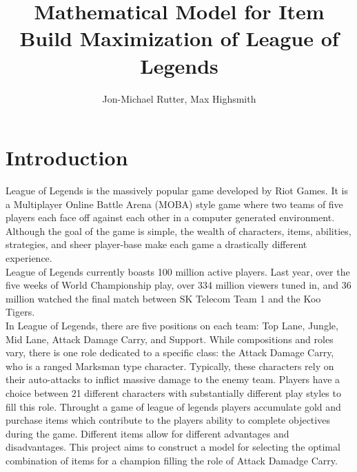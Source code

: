 \documentclass{article}
\begin{document}
\title{Mathematical Model for Item Build Maximization of League of Legends}
\author{Jon-Michael Rutter,  Max Highsmith}

\maketitle

\begin{abstract}

\end{abstract}

\section{Introduction}
League of Legends is the massively popular game developed by Riot Games.  It is a Multiplayer Online Battle Arena (MOBA) style game where two teams of five players each face off against each other in a computer generated environment.  Although the goal of the game is simple, the wealth of characters, items, abilities, strategies, and sheer player-base make each game a drastically different experience. \\
League of Legends currently boasts 100 million active players.  Last year, over the five weeks of World Championship play, over 334 million viewers tuned in, and 36 million watched the final match between SK Telecom Team 1 and the Koo Tigers.\\
In League of Legends, there are five positions on each team: Top Lane, Jungle, Mid Lane, Attack Damage Carry, and Support.  While compositions and roles vary, there is one role dedicated to a specific class: the Attack Damage Carry, who is a ranged Marksman type character.  Typically, these characters rely on their auto-attacks to inflict massive damage to the enemy team.  Players have a choice between 21 different characters with substantially different play styles to fill this role.  Throught a game of league of legends players accumulate gold and purchase items which contribute to the players ability to complete objectives during the game.  Different items allow for different advantages and disadvantages.  This project aims to construct a model for selecting the optimal combination of items for a champion filling the role of Attack Damadge Carry.
\end{document}
